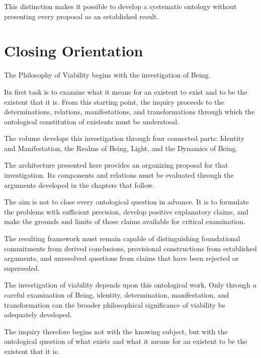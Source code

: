 This distinction makes it possible
to develop a systematic ontology
without presenting every proposal
as an established result.



\section*{Closing Orientation}

The Philosophy of Viability begins
with the investigation of Being.

Its first task is to examine what
it means for an existent to exist
and to be the existent that it is.
From this starting point, the inquiry
proceeds to the determinations,
relations, manifestations, and
transformations through which the
ontological constitution of existents
must be understood.

The volume develops this investigation
through four connected parts:
Identity and Manifestation, the
Realms of Being, Light, and the
Dynamics of Being.

The architecture presented here
provides an organizing proposal for
that investigation. Its components
and relations must be evaluated
through the arguments developed
in the chapters that follow.

The aim is not to close every
ontological question in advance.
It is to formulate the problems
with sufficient precision, develop
positive explanatory claims, and
make the grounds and limits of
those claims available for critical
examination.

The resulting framework must remain
capable of distinguishing foundational
commitments from derived conclusions,
provisional constructions from
established arguments, and unresolved
questions from claims that have
been rejected or superseded.

The investigation of viability
depends upon this ontological work.
Only through a careful examination
of Being, identity, determination,
manifestation, and transformation
can the broader philosophical
significance of viability be
adequately developed.

The inquiry therefore begins
not with the knowing subject,
but with the ontological question
of what exists and what it means
for an existent to be the existent
that it is.


\cleardoublepage

